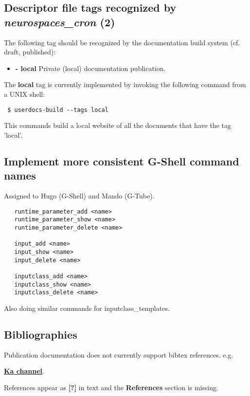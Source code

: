 \documentclass[12pt]{article}
\begin{document}
\subsection{Descriptor file tags recognized by {\it neurospaces\_cron} (2)}

The following tag should be recognized by the documentation build
system (cf. draft, published):
\begin{itemize}
    \item[]{\bf - local} Private (local) documentation publication.
\end{itemize}

The {\bf local} tag is currently implemented by invoking the following
command from a UNIX shell:

\begin{verbatim}
 $ userdocs-build --tags local
\end{verbatim}

This commands build a local website of all the documents that have the
tag 'local'.


\subsection{Implement more consistent G-Shell command names}

Assigned to Hugo (G-Shell) and Mando (G-Tube).

\begin{verbatim}
   runtime_parameter_add <name>
   runtime_parameter_show <name>
   runtime_parameter_delete <name>

   input_add <name>
   input_show <name>
   input_delete <name>

   inputclass_add <name>
   inputclass_show <name>
   inputclass_delete <name>
\end{verbatim}

Also doing similar commands for inputclass\_templates.


\subsection{Bibliographies}

Publication documentation does not currently support bibtex references.
e.g.

\href{http://www.genesis-sim.org/userdocs/pub-purkinje-deschutter-ka/pub-purkinje-deschutter-ka.html}{\bf Ka channel}.

References appear as {\bf [?]} in text and the {\bf References} section is missing.
\end{document}
